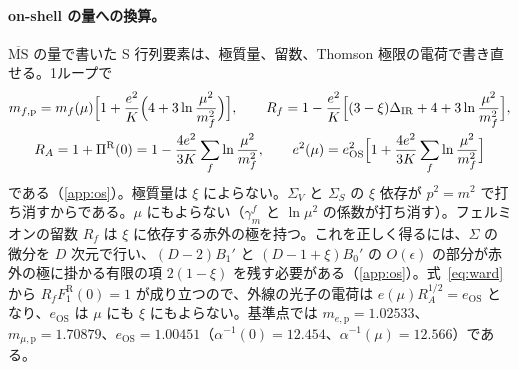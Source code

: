 \documentclass[a4paper,10pt]{ltjsarticle}
\newcommand{\MSbar}{\overline{\mathrm{MS}}}
\newcommand{\DIR}{\Delta_{\mathrm{IR}}}
\begin{document}
\paragraph{on-shell の量への換算。}$\MSbar$ の量で書いた S 行列要素は、極質量、留数、Thomson 極限の電荷で書き直せる。1ループで
\begin{equation}
\begin{gathered}
m_{f,\mathrm p}=m_f(\mu)\Bigl[1+\frac{e^2}{K}\Bigl(4+3\ln\frac{\mu^2}{m_f^2}\Bigr)\Bigr],\qquad
R_f=1-\frac{e^2}{K}\Bigl[(3-\xi)\DIR+4+3\ln\frac{\mu^2}{m_f^2}\Bigr],\\
R_A=1+\Pi^{\mathrm R}(0)=1-\frac{4e^2}{3K}\sum_f\ln\frac{\mu^2}{m_f^2},\qquad
e^2(\mu)=e_{\mathrm{OS}}^2\Bigl[1+\frac{4e^2}{3K}\sum_f\ln\frac{\mu^2}{m_f^2}\Bigr]
\end{gathered}
\label{eq:os}
\end{equation}
である（\ref{app:os}）。極質量は $\xi$ によらない。$\Sigma_V$ と $\Sigma_S$ の $\xi$ 依存が $p^2=m^2$ で打ち消すからである。$\mu$ にもよらない（$\gamma_m^f$ と $\ln\mu^2$ の係数が打ち消す）。フェルミオンの留数 $R_f$ は $\xi$ に依存する赤外の極を持つ。これを正しく得るには、$\Sigma$ の微分を $D$ 次元で行い、$(D-2)B_1'$ と $(D-1+\xi)B_0'$ の $O(\epsilon)$ の部分が赤外の極に掛かる有限の項 $2(1-\xi)$ を残す必要がある（\ref{app:os}）。式~\eqref{eq:ward} から $R_fF_1^{\mathrm R}(0)=1$ が成り立つので、外線の光子の電荷は $e(\mu)R_A^{1/2}=e_{\mathrm{OS}}$ となり、$e_{\mathrm{OS}}$ は $\mu$ にも $\xi$ にもよらない。基準点では $m_{e,\mathrm p}=1.02533$、$m_{\mu,\mathrm p}=1.70879$、$e_{\mathrm{OS}}=1.00451$（$\alpha^{-1}(0)=12.454$、$\alpha^{-1}(\mu)=12.566$）である。
\end{document}
